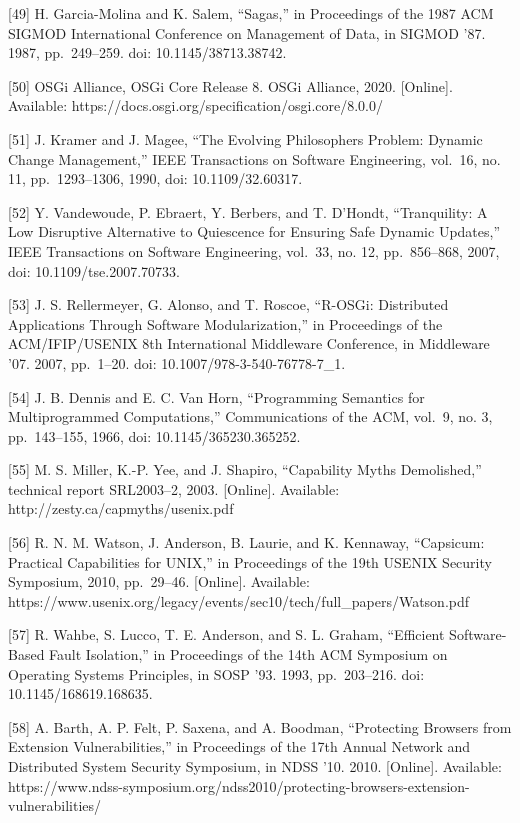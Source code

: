 \documentclass[
  10
]{article}
\begin{document}
{[}49{]} H. Garcia-Molina and K. Salem, ``Sagas,'' in Proceedings of the 1987 ACM
SIGMOD International Conference on Management of Data, in SIGMOD '87. 1987,
pp.~249--259. doi: 10.1145/38713.38742.

{[}50{]} OSGi Alliance, OSGi Core Release 8. OSGi Alliance, 2020. {[}Online{]}.
Available: https://docs.osgi.org/specification/osgi.core/8.0.0/

{[}51{]} J. Kramer and J. Magee, ``The Evolving Philosophers Problem: Dynamic
Change Management,'' IEEE Transactions on Software Engineering, vol.~16, no. 11,
pp.~1293--1306, 1990, doi: 10.1109/32.60317.

{[}52{]} Y. Vandewoude, P. Ebraert, Y. Berbers, and T. D'Hondt, ``Tranquility: A Low
Disruptive Alternative to Quiescence for Ensuring Safe Dynamic Updates,'' IEEE
Transactions on Software Engineering, vol.~33, no. 12, pp.~856--868, 2007, doi:
10.1109/tse.2007.70733.

{[}53{]} J. S. Rellermeyer, G. Alonso, and T. Roscoe, ``R-OSGi: Distributed
Applications Through Software Modularization,'' in Proceedings of the ACM/IFIP/USENIX
8th International Middleware Conference, in Middleware '07. 2007, pp.~1--20. doi:
10.1007/978-3-540-76778-7\_1.

{[}54{]} J. B. Dennis and E. C. Van Horn, ``Programming Semantics for
Multiprogrammed Computations,'' Communications of the ACM, vol.~9, no. 3,
pp.~143--155, 1966, doi: 10.1145/365230.365252.

{[}55{]} M. S. Miller, K.-P. Yee, and J. Shapiro, ``Capability Myths Demolished,''
technical report SRL2003--2, 2003. {[}Online{]}. Available:
http://zesty.ca/capmyths/usenix.pdf

{[}56{]} R. N. M. Watson, J. Anderson, B. Laurie, and K. Kennaway, ``Capsicum:
Practical Capabilities for UNIX,'' in Proceedings of the 19th USENIX Security
Symposium, 2010, pp.~29--46. {[}Online{]}. Available:
https://www.usenix.org/legacy/events/sec10/tech/full\_papers/Watson.pdf

{[}57{]} R. Wahbe, S. Lucco, T. E. Anderson, and S. L. Graham, ``Efficient
Software-Based Fault Isolation,'' in Proceedings of the 14th ACM Symposium on
Operating Systems Principles, in SOSP '93. 1993, pp.~203--216. doi: 10.1145/168619.168635.

{[}58{]} A. Barth, A. P. Felt, P. Saxena, and A. Boodman, ``Protecting Browsers from
Extension Vulnerabilities,'' in Proceedings of the 17th Annual Network and
Distributed System Security Symposium, in NDSS '10. 2010. {[}Online{]}. Available:
https://www.ndss-symposium.org/ndss2010/protecting-browsers-extension-vulnerabilities/
\end{document}
